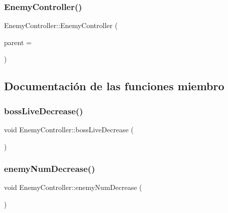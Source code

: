 \subsubsection{\texorpdfstring{Enemy\+Controller()}{EnemyController()}}
{\footnotesize\ttfamily Enemy\+Controller\+::\+Enemy\+Controller (\begin{DoxyParamCaption}\item[{Q\+Graphics\+Text\+Item $\ast$}]{parent = {} }\end{DoxyParamCaption})}



\subsection{Documentación de las funciones miembro}
\hypertarget{class_enemy_controller_a7ad51104e0e740217a33cbfcc9b94138}{}\label{class_enemy_controller_a7ad51104e0e740217a33cbfcc9b94138} 
\subsubsection{\texorpdfstring{boss\+Live\+Decrease()}{bossLiveDecrease()}}
{\footnotesize\ttfamily void Enemy\+Controller\+::boss\+Live\+Decrease (\begin{DoxyParamCaption}{ }\end{DoxyParamCaption})}

\hypertarget{class_enemy_controller_aabdfabc7ce23fb881552c613000bd510}{}\label{class_enemy_controller_aabdfabc7ce23fb881552c613000bd510} 
\subsubsection{\texorpdfstring{enemy\+Num\+Decrease()}{enemyNumDecrease()}}
{\footnotesize\ttfamily void Enemy\+Controller\+::enemy\+Num\+Decrease (\begin{DoxyParamCaption}{ }\end{DoxyParamCaption})}

\hypertarget{class_enemy_controller_af5c777646b3431c543e18bba840a30eb}{}\label{class_enemy_controller_af5c777646b3431c543e18bba840a30eb} 
